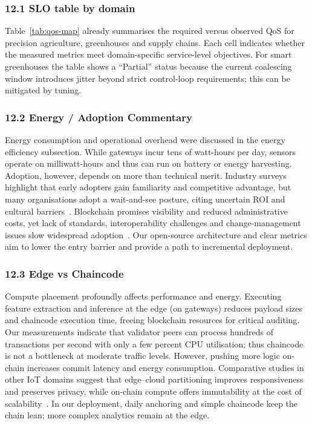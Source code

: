 \documentclass[12pt,onecolumn]{IEEEtran} %
\begin{document}
\subsubsection*{12.1 SLO table by domain}
Table~\ref{tab:qos-map} already summarises the required versus observed QoS for precision agriculture, greenhouses and supply chains. Each cell indicates whether the measured metrics meet domain-specific service-level objectives. For smart greenhouses the table shows a ``Partial'' status because the current coalescing window introduces jitter beyond strict control-loop requirements; this can be mitigated by tuning.

\subsubsection*{12.2 Energy / Adoption Commentary}
Energy consumption and operational overhead were discussed in the energy efficiency subsection. While gateways incur tens of watt-hours per day, sensors operate on milliwatt-hours and thus can run on battery or energy harvesting. Adoption, however, depends on more than technical merit. Industry surveys highlight that early adopters gain familiarity and competitive advantage, but many organisations adopt a wait-and-see posture, citing uncertain ROI and cultural barriers~\cite{gsci_blockchain_supplychain_2022}. Blockchain promises visibility and reduced administrative costs, yet lack of standards, interoperability challenges and change-management issues slow widespread adoption~\cite{gsci_blockchain_supplychain_2022}. Our open-source architecture and clear metrics aim to lower the entry barrier and provide a path to incremental deployment.

\subsubsection*{12.3 Edge vs Chaincode}
Compute placement profoundly affects performance and energy. Executing feature extraction and inference at the edge (on gateways) reduces payload sizes and chaincode execution time, freeing blockchain resources for critical auditing. Our measurements indicate that validator peers can process hundreds of transactions per second with only a few percent CPU utilisation; thus chaincode is not a bottleneck at moderate traffic levels. However, pushing more logic on-chain increases commit latency and energy consumption. Comparative studies in other IoT domains suggest that edge–cloud partitioning improves responsiveness and preserves privacy, while on-chain compute offers immutability at the cost of scalability~\cite{gsci_blockchain_supplychain_2022}. In our deployment, daily anchoring and simple chaincode keep the chain lean; more complex analytics remain at the edge.
\end{document}
